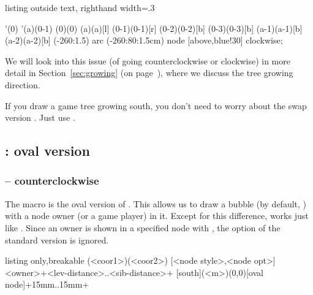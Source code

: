 \begin{tcblisting}{listing outside text, righthand width=.3\linewidth}
\begin{istgame}[font=\scriptsize]
\istroot'(0)
  \istb  \istb  \istb \endist
\istroot'(a)(0-1)
  \istb  \istb  \endist
\xtOwner(0){(0)}
\xtOwner(a){(a)}[l]
\xtPayoff*(0-1){(0-1)}[r]
\xtPayoff*(0-2){(0-2)}[b]
\xtPayoff*(0-3){(0-3)}[b]
\xtPayoff*(a-1){(a-1)}[b]
\xtPayoff*(a-2){(a-2)}[b]
(-260:1.5) 
  arc (-260:80:1.5cm)
  node [above,blue!30] {clockwise};
\end{istgame}
\end{tcblisting}

We will look into this issue (of going counterclockwise or clockwise) in more detail in Section~\ref{sec:growing} (on page~\pageref{sec:growing}), where we discuss the tree growing direction.

If you draw a game tree growing south, you don't need to worry about the swap version . Just use \cmd{\istroot}.

\subsection{\protect\cmd{\istrooto}: oval version}

\label{ssec:istrootstar}

\subsubsection{\protect\cmd{\istrooto} -- counterclockwise}

The macro \icmd{\istrooto} is the oval version of \cmd{\istroot}.
This allows us to draw a bubble (by default, ) with a node owner (or a game player) in it. Except for this difference, \cmd{\istrooto} works just like \cmd{\istroot}. Since an owner is shown in a specified node with \cmd{\istrooto}, the option  of the standard version \cmd{\istroot} is ignored.

\begin{tcblisting}{listing only,breakable}
  (<coor1>)(<coor2>)
           [<node style>,<node opt>]{<owner>}+<lev-distance>..<sib-distance>+
  [south](<m>)(0,0)[oval node]{}+15mm..15mm+
\end{tcblisting}

